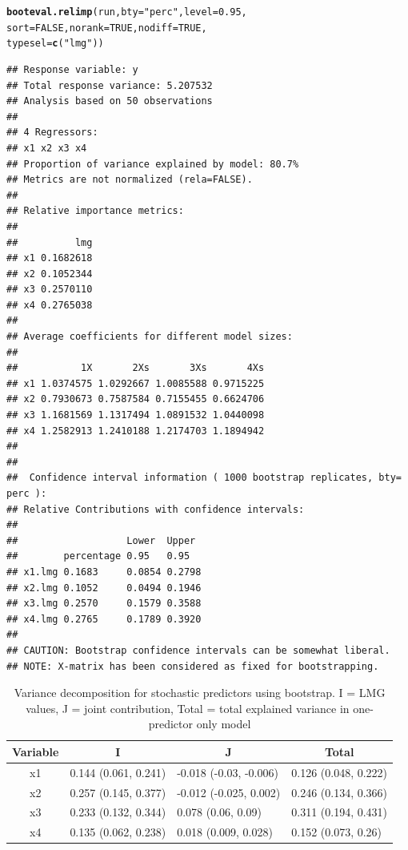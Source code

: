 \documentclass[11pt,a4paper,twoside]{book}
\makeatletter
\newcommand{\hlnum}[1]{\textcolor[rgb]{0.686,0.059,0.569}{#1}}%
\newcommand{\hlstr}[1]{\textcolor[rgb]{0.192,0.494,0.8}{#1}}%
\newcommand{\hlstd}[1]{\textcolor[rgb]{0.345,0.345,0.345}{#1}}%
\newcommand{\hlkwc}[1]{\textcolor[rgb]{0.333,0.667,0.333}{#1}}%
\newcommand{\hlkwd}[1]{\textcolor[rgb]{0.737,0.353,0.396}{\textbf{#1}}}%
\newenvironment{kframe}{%
 \def\at@end@of@kframe{}%
 \ifinner\ifhmode%
  \def\at@end@of@kframe{\end{minipage}}%
  \begin{minipage}{\columnwidth}%
 \fi\fi%
 \def\FrameCommand##1{\hskip\@totalleftmargin \hskip-\fboxsep
 \colorbox{shadecolor}{##1}\hskip-\fboxsep
     \hskip-\linewidth \hskip-\@totalleftmargin \hskip\columnwidth}%
 \MakeFramed {\advance\hsize-\width
   \@totalleftmargin\z@ \linewidth\hsize
   \@setminipage}}%
 {\par\unskip\endMakeFramed%
 \at@end@of@kframe}
\newenvironment{knitrout}{}{} %
\makeatother
\begin{document}
\begin{knitrout}
\begin{kframe}
\begin{alltt}
\hlkwd{booteval.relimp}\hlstd{(run,} \hlkwc{bty} \hlstd{=} \hlstr{"perc"}\hlstd{,} \hlkwc{level} \hlstd{=} \hlnum{0.95}\hlstd{,}
                \hlkwc{sort} \hlstd{=} \hlnum{FALSE}\hlstd{,} \hlkwc{norank} \hlstd{=} \hlnum{TRUE}\hlstd{,} \hlkwc{nodiff} \hlstd{=} \hlnum{TRUE}\hlstd{,}
                \hlkwc{typesel} \hlstd{=} \hlkwd{c}\hlstd{(}\hlstr{"lmg"}\hlstd{))}
\end{alltt}
\begin{verbatim}
## Response variable: y 
## Total response variance: 5.207532 
## Analysis based on 50 observations 
## 
## 4 Regressors: 
## x1 x2 x3 x4 
## Proportion of variance explained by model: 80.7%
## Metrics are not normalized (rela=FALSE). 
## 
## Relative importance metrics: 
## 
##          lmg
## x1 0.1682618
## x2 0.1052344
## x3 0.2570110
## x4 0.2765038
## 
## Average coefficients for different model sizes: 
## 
##           1X       2Xs       3Xs       4Xs
## x1 1.0374575 1.0292667 1.0085588 0.9715225
## x2 0.7930673 0.7587584 0.7155455 0.6624706
## x3 1.1681569 1.1317494 1.0891532 1.0440098
## x4 1.2582913 1.2410188 1.2174703 1.1894942
## 
##  
##  Confidence interval information ( 1000 bootstrap replicates, bty= perc ): 
## Relative Contributions with confidence intervals: 
##  
##                   Lower  Upper
##        percentage 0.95   0.95  
## x1.lmg 0.1683     0.0854 0.2798
## x2.lmg 0.1052     0.0494 0.1946
## x3.lmg 0.2570     0.1579 0.3588
## x4.lmg 0.2765     0.1789 0.3920
## 
## CAUTION: Bootstrap confidence intervals can be somewhat liberal. 
## NOTE: X-matrix has been considered as fixed for bootstrapping.
\end{verbatim}
\end{kframe}
\end{knitrout}

\begin{table}[h]
\centering
\begin{tabular}{clll}
  \hline
  \multicolumn{1}{c}{\textbf{Variable}} & \multicolumn{1}{c}{\textbf{I}} &\multicolumn{1}{c}{\textbf{J}} & \multicolumn{1}{c}{\textbf{Total}} \\
  \hline
x1 & 0.144 (0.061, 0.241)  & -0.018 (-0.03, -0.006)   & 0.126 (0.048, 0.222)  \\ 
x2 & 0.257 (0.145, 0.377)  & -0.012 (-0.025, 0.002)   & 0.246 (0.134, 0.366)  \\ 
x3 & 0.233 (0.132, 0.344)  & 0.078 (0.06, 0.09)   & 0.311 (0.194, 0.431)  \\ 
x4 & 0.135 (0.062, 0.238)  & 0.018 (0.009, 0.028)   & 0.152 (0.073, 0.26)  \\ 

   \hline
\end{tabular}
\caption{Variance decomposition for stochastic predictors using bootstrap. I = LMG values, J = joint contribution, Total = total explained variance in one-predictor only model}
\label{tbl:fundus.to.SLO}
\end{table}
\end{document}
